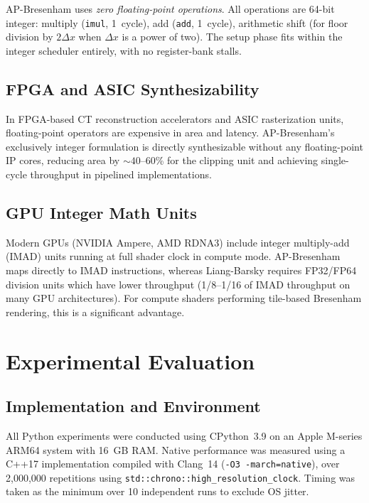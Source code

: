 \documentclass[12pt,a4paper]{article}
\theoremstyle{definition}
\newcommand{\dx}{\Delta x}
\begin{document}
AP-Bresenham uses \emph{zero floating-point operations}.
All operations are 64-bit integer: multiply (\texttt{imul},
1~cycle), add (\texttt{add}, 1~cycle), arithmetic shift
(for floor division by $2\dx$ when $\dx$ is a power of
two). The setup phase fits within the integer scheduler
entirely, with no register-bank stalls.

\subsection{FPGA and ASIC Synthesizability}

In FPGA-based CT reconstruction accelerators and ASIC
rasterization units, floating-point operators are expensive
in area and latency. AP-Bresenham's exclusively integer
formulation is directly synthesizable without any
floating-point IP cores, reducing area by $\sim40$--60\%
for the clipping unit and achieving single-cycle throughput
in pipelined implementations.

\subsection{GPU Integer Math Units}

Modern GPUs (NVIDIA Ampere, AMD RDNA3) include integer
multiply-add (IMAD) units running at full shader clock in
compute mode. AP-Bresenham maps directly to IMAD
instructions, whereas Liang-Barsky requires FP32/FP64
division units which have lower throughput (1/8--1/16 of
IMAD throughput on many GPU architectures). For compute
shaders performing tile-based Bresenham rendering, this
is a significant advantage.

\section{Experimental Evaluation}
\label{sec:experiments}

\subsection{Implementation and Environment}

All Python experiments were conducted using CPython~3.9
on an Apple M-series ARM64 system with 16~GB RAM. Native
performance was measured using a C++17 implementation
compiled with Clang~14 (\texttt{-O3 -march=native}), over
2,000,000 repetitions using
\texttt{std::chrono::high\_resolution\_clock}. Timing was
taken as the minimum over 10 independent runs to exclude
OS jitter.
\end{document}
